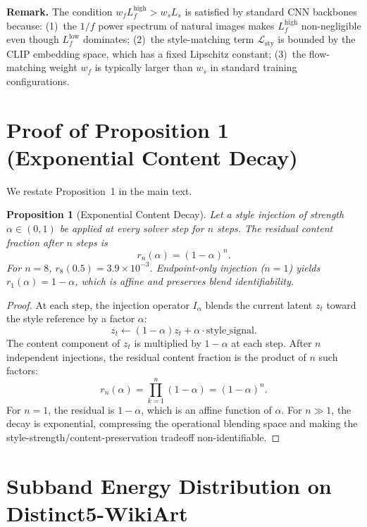 \documentclass[letterpaper]{article}
\newtheorem{proposition}{Proposition}
\begin{document}
\textbf{Remark.} The condition $w_f L_f^{\mathrm{high}} > w_s L_s$ is satisfied by standard CNN backbones because: (1)~the $1/f$ power spectrum of natural images makes $L_f^{\mathrm{high}}$ non-negligible even though $L_f^{\mathrm{low}}$ dominates; (2)~the style-matching term $\mathcal{L}_{\mathrm{sty}}$ is bounded by the CLIP embedding space, which has a fixed Lipschitz constant; (3)~the flow-matching weight $w_f$ is typically larger than $w_s$ in standard training configurations.

\section{Proof of Proposition 1 (Exponential Content Decay)}
\label{sec:appendix-eota}

We restate Proposition~1 in the main text.

\begin{proposition}[Exponential Content Decay]
Let a style injection of strength $\alpha \in (0,1)$ be applied at every solver step for $n$ steps. The residual content fraction after $n$ steps is
\begin{equation}
r_n(\alpha) = (1-\alpha)^n.
\end{equation}
For $n=8$, $r_8(0.5) = 3.9 \times 10^{-3}$. Endpoint-only injection ($n=1$) yields $r_1(\alpha) = 1-\alpha$, which is affine and preserves blend identifiability.
\end{proposition}

\begin{proof}
At each step, the injection operator $I_\alpha$ blends the current latent $z_t$ toward the style reference by a factor $\alpha$:
\begin{equation}
z_t \leftarrow (1-\alpha) z_t + \alpha \cdot \text{style\_signal}.
\end{equation}
The content component of $z_t$ is multiplied by $1-\alpha$ at each step. After $n$ independent injections, the residual content fraction is the product of $n$ such factors:
\begin{equation}
r_n(\alpha) = \prod_{k=1}^{n} (1-\alpha) = (1-\alpha)^n.
\end{equation}
For $n=1$, the residual is $1-\alpha$, which is an affine function of $\alpha$. For $n \gg 1$, the decay is exponential, compressing the operational blending space and making the style-strength/content-preservation tradeoff non-identifiable.
\end{proof}

\section{Subband Energy Distribution on Distinct5-WikiArt}
\label{sec:appendix-spectrum}
\end{document}
